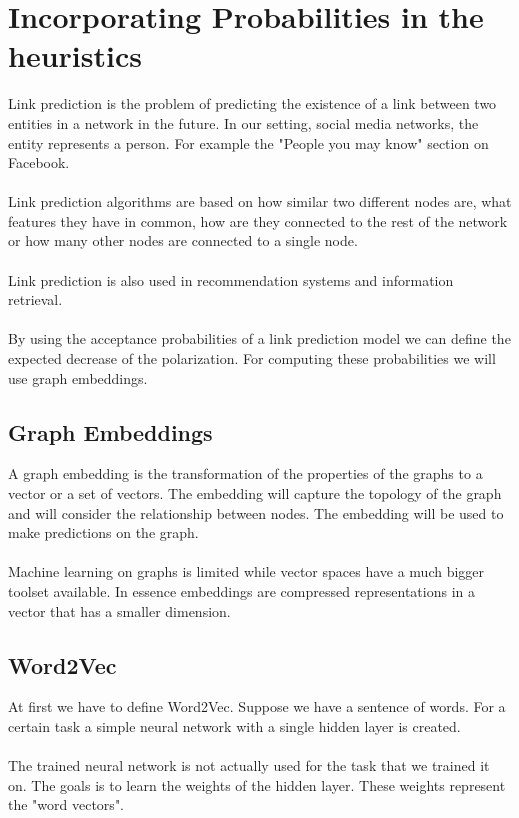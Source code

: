 \section{Incorporating Probabilities in the heuristics}		
 \label{sec:linkpred}		

Link prediction is the problem of predicting the existence of a link between two entities in a network in the future. In our setting, social media networks, the entity represents a person. For example the "People you may know" section on Facebook.		
 \\		
 \\		
 Link prediction algorithms are based on how similar two different nodes are, what features they have in common, how are they connected to the rest of the network or how many other nodes are connected to a single node. 		
 \\		
 \\		
 Link prediction is also used in recommendation systems and  information retrieval.
 \\
 \\
 By using the acceptance probabilities of a link prediction model we can define the expected decrease of the polarization. For computing these probabilities we will use graph embeddings.

  \subsection{Graph Embeddings}		
 \label{sec:embeddings}		

  A graph embedding is the transformation of the properties of the graphs to a vector or a set of vectors. The embedding will capture the topology of the graph and will consider the relationship between nodes. The embedding will be used to make predictions on the graph.		
 \\		
 \\		
 \noindent Machine learning on graphs is limited while vector spaces have a much bigger toolset available. In essence embeddings are compressed representations in a vector that has a smaller dimension.		

  \subsection{Word2Vec}		

  At first we have to define Word2Vec. Suppose we have a sentence of words. For a certain task a simple neural network with a single hidden layer is created. 
 \\
 \\
 The trained neural network is not actually used for the task that we trained it on. The goals is to learn the weights of the hidden layer. These weights represent the "word vectors".		
\clearpage

